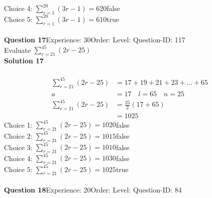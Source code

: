 \documentclass{article}
\begin{document}
Choice 4: \hspace{20pt}$\displaystyle\sum_{r=1}^{20} (3r-1)=620$\hspace{20pt}false\\
Choice 5: \hspace{20pt}$\displaystyle\sum_{r=1}^{20} (3r-1)=610$\hspace{20pt}true\\
\\[4pt]
\noindent\textbf{Question 17}\hspace{20pt}Experience: 30\hspace{20pt}Order: \hspace{20pt}Level: \hspace{20pt}Question-ID: 117\\[2pt]
Evaluate $\displaystyle\sum_{r=21}^{45} (2r-25)$\\[4pt]
\noindent\textbf{Solution 17}\\[2pt]
\\[-35pt]\begin{align*}
\displaystyle\sum_{r=21}^{45} (2r-25)&=17+19+21+23+...+65\\[2pt]
a&=17\quad l=65 \quad n=25\\[2pt]
\displaystyle\sum_{r=21}^{45} (2r-25)&=\displaystyle\frac{25}{2}(17+65)\\[2pt]
&=1025
\end{align*}
Choice 1: \hspace{20pt}$\displaystyle\sum_{r=21}^{45} (2r-25)=1020$\hspace{20pt}false\\
Choice 2: \hspace{20pt}$\displaystyle\sum_{r=21}^{45} (2r-25)=1015$\hspace{20pt}false\\
Choice 3: \hspace{20pt}$\displaystyle\sum_{r=21}^{45} (2r-25)=1010$\hspace{20pt}false\\
Choice 4: \hspace{20pt}$\displaystyle\sum_{r=21}^{45} (2r-25)=1030$\hspace{20pt}false\\
Choice 5: \hspace{20pt}$\displaystyle\sum_{r=21}^{45} (2r-25)=1025$\hspace{20pt}true\\
\\[4pt]
\noindent\textbf{Question 18}\hspace{20pt}Experience: 20\hspace{20pt}Order: \hspace{20pt}Level: \hspace{20pt}Question-ID: 84\\[2pt]
\end{document}
